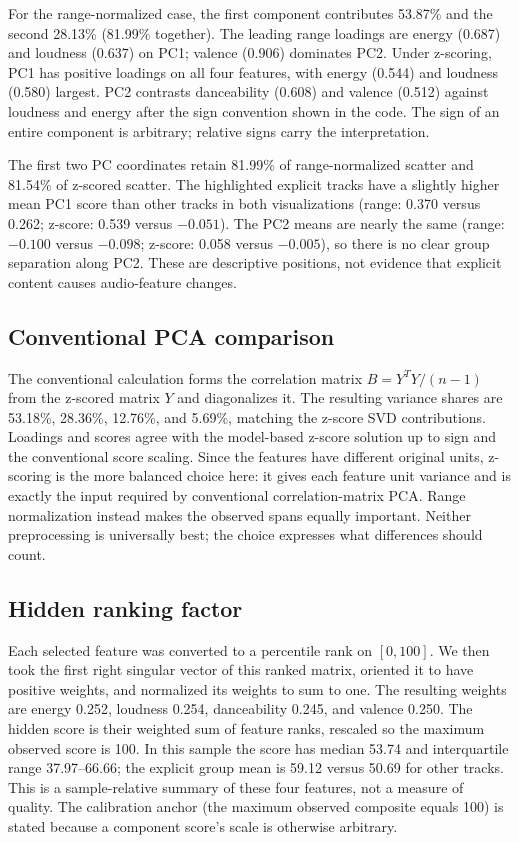 \documentclass[11pt,a4paper]{article}
\begin{document}
For the range-normalized case, the first component contributes 53.87\% and
the second 28.13\% (81.99\% together). The leading range loadings are
energy (0.687) and loudness (0.637) on PC1; valence (0.906) dominates PC2.
Under z-scoring, PC1 has positive loadings on all four features, with energy
(0.544) and loudness (0.580) largest. PC2 contrasts danceability (0.608) and
valence (0.512) against loudness and energy after the sign convention shown
in the code. The sign of an entire component is arbitrary; relative signs
carry the interpretation.

The first two PC coordinates retain 81.99\% of range-normalized scatter and
81.54\% of z-scored scatter. The highlighted explicit tracks have a slightly
higher mean PC1 score than other tracks in both visualizations (range:
0.370 versus 0.262; z-score: 0.539 versus $-0.051$). The PC2 means are nearly
the same (range: $-0.100$ versus $-0.098$; z-score: 0.058 versus $-0.005$),
so there is no clear group separation along PC2. These are descriptive
positions, not evidence that explicit content causes audio-feature changes.

\subsection{Conventional PCA comparison}

The conventional calculation forms the correlation matrix
$B=Y^TY/(n-1)$ from the z-scored matrix $Y$ and diagonalizes it. The resulting
variance shares are 53.18\%, 28.36\%, 12.76\%, and 5.69\%, matching the
z-score SVD contributions. Loadings and scores agree with the model-based
z-score solution up to sign and the conventional score scaling. Since the
features have different original units, z-scoring is the more balanced
choice here: it gives each feature unit variance and is exactly the input
required by conventional correlation-matrix PCA. Range normalization instead
makes the observed spans equally important. Neither preprocessing is
universally best; the choice expresses what differences should count.

\subsection{Hidden ranking factor}

Each selected feature was converted to a percentile rank on $[0,100]$. We
then took the first right singular vector of this ranked matrix, oriented it
to have positive weights, and normalized its weights to sum to one. The
resulting weights are energy 0.252, loudness 0.254, danceability 0.245, and
valence 0.250. The hidden score is their weighted sum of feature ranks,
rescaled so the maximum observed score is 100. In this sample the score has
median 53.74 and interquartile range 37.97--66.66; the explicit group mean is
59.12 versus 50.69 for other tracks. This is a sample-relative summary of
these four features, not a measure of quality. The calibration anchor (the
maximum observed composite equals 100) is stated because a component score's
scale is otherwise arbitrary.
\end{document}
